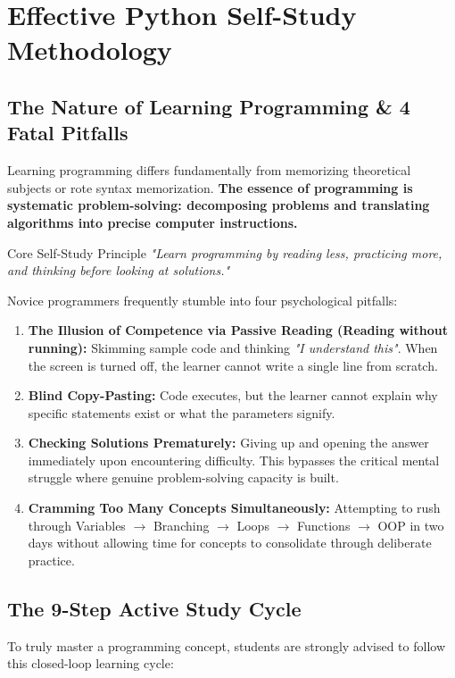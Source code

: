 \documentclass[11pt,a4paper]{article}
\begin{document}
\newpage
\section{Effective Python Self-Study Methodology}

\subsection{The Nature of Learning Programming \& 4 Fatal Pitfalls}
Learning programming differs fundamentally from memorizing theoretical subjects or rote syntax memorization. \textbf{The essence of programming is systematic problem-solving: decomposing problems and translating algorithms into precise computer instructions.}

\begin{tipbox}{Core Self-Study Principle}
\textit{"Learn programming by reading less, practicing more, and thinking before looking at solutions."}
\end{tipbox}

Novice programmers frequently stumble into four psychological pitfalls:
\begin{enumerate}[leftmargin=1.5em, itemsep=3pt]
    \item \textbf{The Illusion of Competence via Passive Reading (Reading without running):} Skimming sample code and thinking \textit{"I understand this"}. When the screen is turned off, the learner cannot write a single line from scratch.
    \item \textbf{Blind Copy-Pasting:} Code executes, but the learner cannot explain why specific statements exist or what the parameters signify.
    \item \textbf{Checking Solutions Prematurely:} Giving up and opening the answer immediately upon encountering difficulty. This bypasses the critical mental struggle where genuine problem-solving capacity is built.
    \item \textbf{Cramming Too Many Concepts Simultaneously:} Attempting to rush through Variables $\rightarrow$ Branching $\rightarrow$ Loops $\rightarrow$ Functions $\rightarrow$ OOP in two days without allowing time for concepts to consolidate through deliberate practice.
\end{enumerate}

\subsection{The 9-Step Active Study Cycle}
To truly master a programming concept, students are strongly advised to follow this closed-loop learning cycle:
\end{document}
